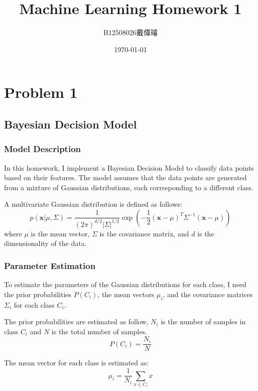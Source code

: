 \documentclass[12pt,a4paper]{article}
\title{Machine Learning Homework 1}
\author{B12508026戴偉璿}
\date{\today}
\begin{document}
\maketitle

\newpage
\tableofcontents
\newpage

\section{Problem 1}

\subsection{Bayesian Decision Model}
\subsubsection{Model Description}
In this homework, I implement a Bayesian Decision Model to classify data points based on their features. The model assumes that the data points are generated from a mixture of Gaussian distributions, each corresponding to a different class.

A multivariate Gaussian distribution is defined as follows:
\begin{equation}
p(\mathbf{x}|\mu, \Sigma) = \frac{1}{(2\pi)^{d/2} |\Sigma|^{1/2}} \exp\left(-\frac{1}{2}(\mathbf{x}-\mu)^T \Sigma^{-1} (\mathbf{x}-\mu)\right)
\end{equation}
where $\mu$ is the mean vector, $\Sigma$ is the covariance matrix, and $d$ is the dimensionality of the data.

\subsubsection{Parameter Estimation}
To estimate the parameters of the Gaussian distributions for each class, I need the prior probabilities $P(C_i)$, the mean vectors $\mu_i$, and the covariance matrices $\Sigma_i$ for each class $C_i$. 

The prior probabilities are estimated as follow, $N_i$ is the number of samples in class $C_i$ and $N$ is the total number of samples.
\begin{equation}
P(C_i) = \frac{N_i}{N}
\end{equation}

The mean vector for each class is estimated as:
\begin{equation}
\mu_i = \frac{1}{N_i} \sum_{x \in C_i} x
\end{equation}
\end{document}
